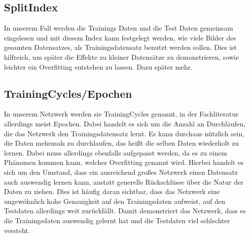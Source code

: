 \documentclass[12pt]{article}
\begin{document}
\subsection{SplitIndex}
In unserem Fall werden die Trainings Daten und die Test Daten gemeinsam eingelesen und mit diesem Index kann festgelegt werden, wie viele Bilder des gesamten Datensatzes, als Trainingsdatensatz benutzt werden sollen. Dies ist hilfreich, um später die Effekte zu kleiner Datensätze zu demonstrieren, sowie leichter ein Overfitting entstehen zu lassen. Dazu später mehr.
\subsection{TrainingCycles/Epochen}
In unserem Netzwerk werden sie TrainingCycles genannt, in der Fachliteratur allerdings meist Epochen. Dabei handelt es sich um die Anzahl an Durchläufen, die das Netzwerk den Trainingsdatensatz lernt. Es kann durchaus nützlich sein, die Daten mehrmals zu durchlaufen, das heißt die selben Daten wiederholt zu lernen. Dabei muss allerdings ebenfalls aufgepasst werden, da es zu einem Phänomen kommen kann, welches Overfitting genannt wird. Hierbei handelt es sich um den Umstand, dass ein ausreichend großes Netzwerk einen Datensatz auch auswendig lernen kann, anstatt generelle Rückschlüsse über die Natur der Daten zu ziehen. Dies ist häufig daran sichtbar, dass das Netzwerk eine ungewöhnlich hohe Genauigkeit auf den Trainingsdaten aufweist, auf den Testdaten allerdings weit zurückfällt. Damit demonstriert das Netzwerk, dass es die Trainingsdaten auswendig gelernt hat und die Testdaten viel schlechter versteht. 
\end{document}
